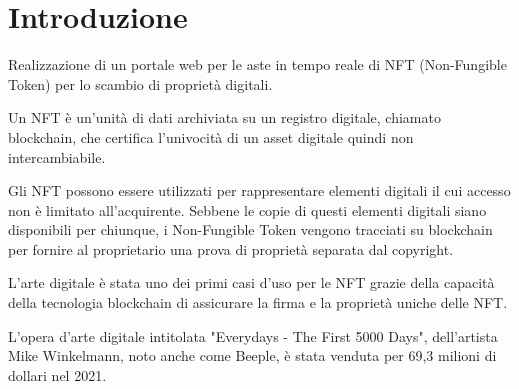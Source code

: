 \section{Introduzione}
Realizzazione di un portale web per le aste in tempo reale di NFT (Non-Fungible Token) per lo scambio di proprietà digitali.

Un NFT è un'unità di dati archiviata su un registro digitale, chiamato blockchain,
che certifica l'univocità di un asset digitale quindi non intercambiabile. \cite{nft1}

Gli NFT possono essere utilizzati per rappresentare elementi digitali il cui accesso non è limitato all'acquirente.
Sebbene le copie di questi elementi digitali siano disponibili per chiunque, 
i Non-Fungible Token vengono tracciati su blockchain per fornire al proprietario una prova di proprietà separata dal copyright. \cite{nft2}

L'arte digitale è stata uno dei primi casi d'uso per le NFT grazie della capacità della tecnologia blockchain di assicurare la firma e la proprietà uniche delle NFT.

L'opera d'arte digitale intitolata "Everydays - The First 5000 Days", dell'artista Mike Winkelmann, noto anche come Beeple, 
è stata venduta per 69,3 milioni di dollari nel 2021.\cite{nft3}



